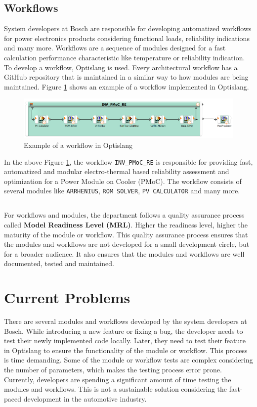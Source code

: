 \subsection{Workflows}
System developers at Bosch are responsible for developing automatized workflows for power electronics products considering functional loads, reliability indications and many more. Workflows 
are a sequence of modules designed for a fast calculation performance characteristic like temperature or reliability indication. To develop a workflow, 
Optislang is used. Every architectural workflow has a GitHub repository 
that is maintained in a similar way to how modules are being maintained. Figure \ref{workflow_example} shows an example of a workflow implemented in Optislang.
\begin{figure}[!h]
    \centering
    \includegraphics[width=\textwidth]{Images/workflow_example.png}
    \caption{Example of a workflow in Optislang}
    \label{workflow_example}
\end{figure}

In the above Figure \ref{workflow_example}, the workflow \texttt{INV\_PMoC\_RE} is responsible for providing fast, automatized and modular electro-thermal based 
reliability assessment and optimization for a Power Module on Cooler (PMoC). The workflow consists of several modules like \texttt{ARRHENIUS}, \texttt{ROM SOLVER},
\texttt{PV CALCULATOR} and many more.
\subsection*{}
For workflows and modules, the department follows a quality assurance process called \textbf{Model Readiness Level (MRL)}. Higher the readiness level, higher
the maturity of the module or workflow. This quality assurance process ensures that the modules and workflows are not developed for a small development 
circle, but for a broader audience. It also ensures that the modules and workflows are well documented, tested and maintained.

\section{Current Problems} \label{current problem}
There are several modules and workflows developed by the system developers at Bosch. While introducing a new feature or fixing a bug, the developer needs to test their
newly implemented code locally. Later, they need to test their feature in Optislang to ensure the functionality of the module or workflow. This process is 
time demanding. Some of the module or workflow tests are complex considering the number of parameters, which makes the testing process error prone. Currently, 
developers are spending a significant amount of time testing the modules and workflows. This is not a sustainable solution considering the fast-paced development in the automotive industry.

